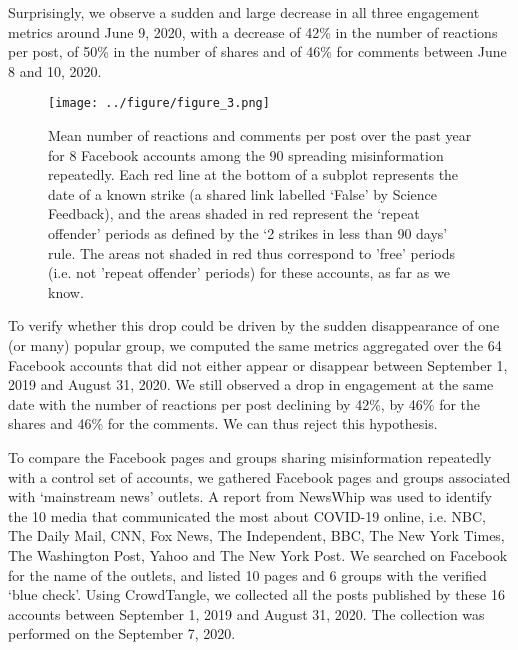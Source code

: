\documentclass[sigconf]{acmart}
\begin{document}
Surprisingly, we observe a sudden and large decrease in all three engagement metrics around June 9, 2020, with a decrease of 42\% in the number of reactions per post, of 50\% in the number of shares and of 46\% for comments between June 8 and 10, 2020.

\begin{figure*}[h]
  \centering
  \texttt{[image: ../figure/figure\_3.png]}
  \caption{Mean number of reactions and comments per post over the past year for 8 Facebook accounts among the 90 spreading misinformation repeatedly. Each red line at the bottom of a subplot represents the date of a known strike (a shared link labelled `False' by Science Feedback), and the areas shaded in red represent the `repeat offender' periods as defined by the `2 strikes in less than 90 days' rule. The areas not shaded in red thus correspond to 'free' periods (i.e. not 'repeat offender' periods) for these accounts, as far as we know.}
  \label{figure_3}
\end{figure*}

To verify whether this drop could be driven by the sudden disappearance of one (or many) popular group, we computed the same metrics aggregated over the 64 Facebook accounts that did not either appear or disappear between September 1, 2019 and August 31, 2020. We still observed a drop in engagement at the same date with the number of reactions per post declining by 42\%, by 46\% for the shares and 46\% for the comments. We can thus reject this hypothesis.

To compare the Facebook pages and groups sharing misinformation repeatedly with a control set of accounts, we gathered Facebook pages and groups associated with `mainstream news' outlets. A report from NewsWhip \cite{NewsWhip} was used to identify the 10 media that communicated the most about COVID-19 online, i.e. NBC, The Daily Mail, CNN, Fox News, The Independent, BBC, The New York Times, The Washington Post, Yahoo and The New York Post. We searched on Facebook for the name of the outlets, and listed 10 pages and 6 groups with the verified `blue check'. Using CrowdTangle, we collected all the posts published by these 16 accounts between September 1, 2019 and August 31, 2020. The collection was performed on the September 7, 2020.
\end{document}
